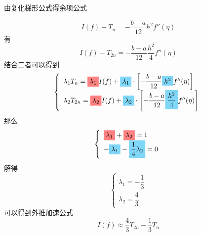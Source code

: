 \begin{example}
    由复化梯形公式得余项公式
    \begin{solution}
        \[
            I(f)-T_{n} = -\dfrac{b-a}{12}h^2f''(\eta)
        \]
        有
        \[
            I(f)-T_{2n} = -\dfrac{b-a}{12}\dfrac{h^2}{4}f''(\eta)
        \]
        结合二者可以得到
        \[
            \left\{
                \begin{array}{l}
                    \lambda_1 T_{n} = \colorbox{red!50}{$\lambda_1$}I(f) + \colorbox{cyan!50}{$\lambda_1$}\cdot\left[ -\dfrac{b-a}{12}\colorbox{cyan!50}{$h^2$}f''(\eta) \right]\\
                    \lambda_2 T_{2n} = \colorbox{red!50}{$\lambda_2$}I(f) + \colorbox{cyan!50}{$\lambda_2$}\cdot\left[ -\dfrac{b-a}{12}\colorbox{cyan!50}{$\dfrac{h^2}{4}$}f''(\eta) \right]
                \end{array}
            \right.
        \]
        那么
        \[
            \left\{
                \begin{array}{l}
                    \colorbox{red!50}{$\lambda_1$}+\colorbox{red!50}{$\lambda_2$} = 1\\
                    -\colorbox{cyan!50}{$\lambda_1$}-\colorbox{cyan!50}{$\dfrac{1}{4}\lambda_2$} = 0
                \end{array}
            \right.
        \]
        解得
        \[
            \left\{
                \begin{array}{l}
                    \lambda_1 = -\dfrac{1}{3} \\
                    \lambda_2 = \dfrac{4}{3}
                \end{array}
            \right.
        \]
        可以得到外推加速公式
        \[
            I(f) \approx \dfrac{4}{3}T_{2n}-\dfrac{1}{3}T_{n}
        \]
    \end{solution}
\end{example}
